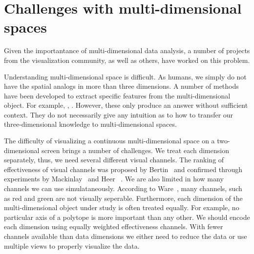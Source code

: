 
\section{Challenges with multi-dimensional spaces}
\label{sec:multi-d-challenges}

Given the importantance of multi-dimensional data analysis, a number of
projects from the visualization community, as well as others, have worked on
this problem. 


Understanding multi-dimensional space is difficult. As humans, we simply do 
not have the spatial analogs in more than three dimensions. A number of methods
have been developed to extract specific features from the multi-dimensional
object. For example, , .
However, these only produce an answer without sufficient context. They do not 
necessarily give any intuition as to how to transfer our three-dimensional
knowledge to multi-dimensional spaces.



The difficulty of visualizing a continuous multi-dimensional space on a
two-dimensional screen brings a number of challenges. We treat each dimension
separately, thus, we need several different visual channels. The ranking of
effectiveness of visual channels was proposed by Bertin~\cite{Bertin:1967} and
confirmed through experiments by Mackinlay~\cite{Mackinlay:1986} and
Heer~\cite{Heer} . We are also limited in how many channels we
can use simulataneously. According to Ware~\cite{Ware:2004}, many channels, such as
red and green are not visually seperable. Furthermore, each dimension of the
multi-dimensional object under study is often treated equally. For example, no
particular axis of a polytope is more important than any other.  We should
encode each dimension using equally weighted effectiveness channels.  With
fewer channels available than data dimensions we either need to reduce the data
or use multiple views to properly visualize the data.


